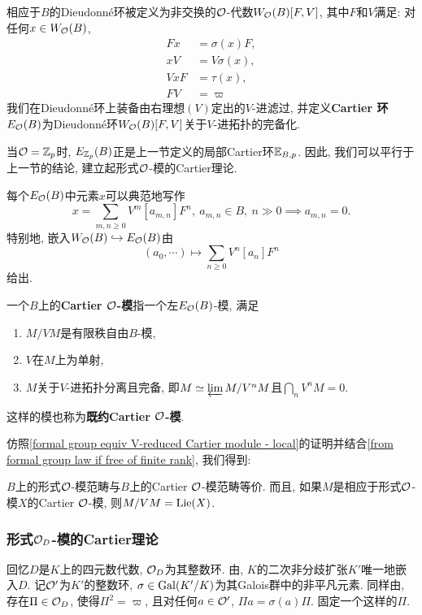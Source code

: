 \begin{definition}\label{def: Cartier ring}
    相应于$B$的Dieudonn\'e环被定义为非交换的$\mathcal{O}$-代数$W_{\mathcal{O}}(B)[F, V]$, 其中$F$和$V$满足: 对任何$x\in W_{\mathcal{O}}(B)$,\begin{align*}
        Fx &= \sigma(x)F,\\
        xV &= V\sigma(x),\\
        VxF &= \tau(x),\\
        FV &= \varpi
    \end{align*}
    我们在Dieudonn\'e环上装备由右理想$(V)$定出的$V$-进滤过,
    并定义\textbf{Cartier 环}$E_{\mathcal{O}}(B)$为Dieudonn\'e环$W_{\mathcal{O}}(B)[F, V]$关于$V$-进拓扑的完备化.
\end{definition}
当$\mathcal{O} = \mathbb{Z}_p$时, $E_{\mathbb{Z}_p}(B)$正是上一节定义的局部Cartier环$\mathbb{E}_{B, p}$.
因此, 我们可以平行于上一节的结论, 建立起形式$\mathcal{O}$-模的Cartier理论.

每个$E_{\mathcal{O}}(B)$中元素$x$可以典范地写作\[x = \sum_{m, n\ge 0} V^m [a_{m, n}] F^n,\ a_{m, n}\in B,\ n\gg 0\implies a_{m, n} = 0.\]
特别地, 嵌入$W_{\mathcal{O}}(B)\hookrightarrow E_{\mathcal{O}}(B)$由\[(a_0, \cdots)\mapsto \sum_{n\ge 0} V^n[a_n]F^n\]给出.

\begin{definition}
    一个$B$上的\textbf{Cartier $\mathcal{O}$-模}指一个左$E_{\mathcal{O}}(B)$-模, 满足\begin{enumerate}
        \item $M/VM$是有限秩自由$B$-模,
        \item $V$在$M$上为单射,
        \item $M$关于$V$-进拓扑分离且完备, 即$M \simeq\varprojlim M/V^nM$且$\bigcap_{n}V^nM = 0$.
    \end{enumerate}这样的模也称为\textbf{既约Cartier $\mathcal{O}$-模}.
\end{definition}

仿照\cref{formal group equiv V-reduced Cartier module - local}\;的证明并结合\cref{from formal group law if free of finite rank},
我们得到:
\begin{theorem}
    $B$上的形式$\mathcal{O}$-模范畴与$B$上的Cartier $\mathcal{O}$-模范畴等价.
    而且, 如果$M$是相应于形式$\mathcal{O}$-模$X$的Cartier $\mathcal{O}$-模, 则$M/VM = \operatorname{Lie}(X)$.\qedhere
\end{theorem}


\subsubsection{形式$\mathcal{O}_D$-模的Cartier理论}
回忆$D$是$K$上的四元数代数, $\mathcal{O}_D$为其整数环.
由\cite[Theorem 13.3.11]{Vo21}, $K$的二次非分歧扩张$K'$唯一地嵌入$D$.
记$\mathcal{O}'$为$K'$的整数环, $\sigma\in\operatorname{Gal}(K'/K)$为其Galois群中的非平凡元素.
同样由\cite[Theorem 13.3.11]{Vo21}, 存在$\Pi\in\mathcal{O}_D$, 使得$\Pi^2 = \varpi$, 且对任何$a\in\mathcal{O}'$, $\Pi a = \sigma(a)\Pi$. 固定一个这样的$\Pi$.

